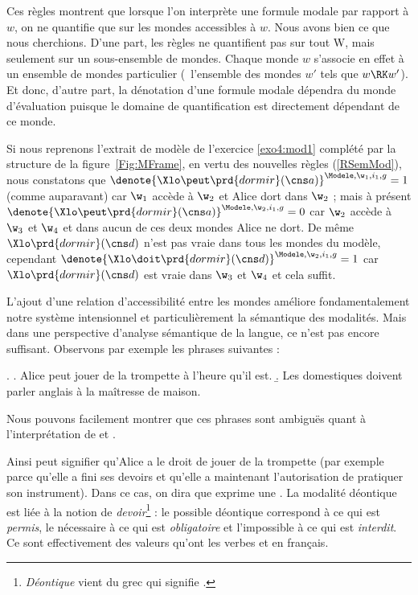 Ces règles montrent que lorsque l'on interprète une formule modale par rapport à $w$, on ne quantifie que sur les mondes accessibles à $w$.
Nous avons bien ce que nous cherchions. D'une part, les règles ne quantifient pas sur tout \Unv W, mais seulement sur un sous-ensemble de mondes. Chaque monde $w$  s'associe en effet à  un ensemble de mondes particulier
 (\ie\ l'ensemble des mondes $w'$ tels que $w\RK w'$). Et donc, d'autre part, la dénotation d'une formule modale dépendra du monde d'évaluation puisque le domaine de quantification est directement dépendant de ce monde. 


\sloppy

Si nous reprenons l'extrait de  modèle de l'exercice \ref{exo4:mod1} complété par la structure de la
figure~\ref{Fig:MFrame}, en vertu des nouvelles règles (\RSem\ref{RSemMod}), nous constatons que \(\denote{\Xlo\peut\prd{dormir}(\cns a)}^{\Modele,\w_1,i_1,g}=1\) (comme auparavant) car $\w_1$ accède à $\w_2$ et Alice dort dans $\w_2$ ; mais à présent \(\denote{\Xlo\peut\prd{dormir}(\cns a)}^{\Modele,\w_2,i_1,g}=0\) car $\w_2$ accède à $\w_3$ et $\w_4$ et dans aucun de ces deux mondes Alice ne dort.  De même \(\Xlo\prd{dormir}(\cns d)\) n'est pas vraie dans tous les mondes du modèle, cependant \(\denote{\Xlo\doit\prd{dormir}(\cns d)}^{\Modele,\w_2,i_1,g}=1\) car \(\Xlo\prd{dormir}(\cns d)\) est vraie dans $\w_3$ et $\w_4$ et cela suffit.

\fussy

L'ajout d'une relation d'accessibilité entre les mondes améliore fondamentalement notre système intensionnel et particulièrement la sémantique des modalités. 
Mais dans une perspective d'analyse sémantique de la langue, ce n'est pas encore suffisant. Observons par exemple les phrases suivantes :

\ex.
\a. Alice peut jouer de la trompette à l'heure qu'il est.
\b. Les domestiques doivent parler anglais à la maîtresse de maison.

Nous pouvons facilement montrer que ces phrases sont ambiguës quant à l'interprétation de  et . 

Ainsi \Last[a] peut signifier qu'Alice a le droit de jouer de la trompette (par exemple parce qu'elle a fini ses devoirs et qu'elle a maintenant l'autorisation de pratiquer son instrument). Dans ce cas, on dira que  exprime une . La modalité déontique est liée à la notion de \emph{devoir}\footnote{\emph{Déontique} vient du grec  qui signifie .} : le possible déontique correspond à ce qui est \emph{permis}, le nécessaire à ce qui est \emph{obligatoire} et l'impossible à ce qui est \emph{interdit}.  
Ce sont effectivement des valeurs qu'ont les verbes  et  en français.  


